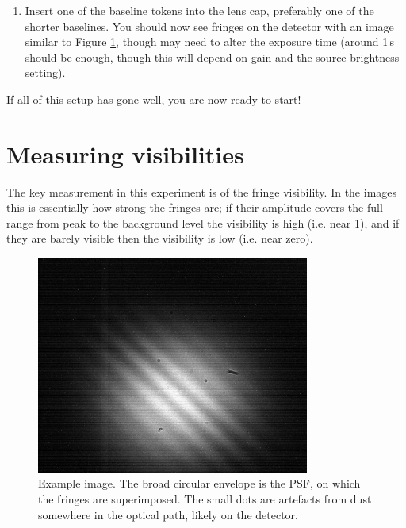 \documentclass[11pt]{article}
\begin{document}
\begin{enumerate}
    \item Insert one of the baseline tokens into the lens cap, preferably one of the shorter baselines. You should now see fringes on the detector with an image similar to Figure \ref{fig:det-img}, though may need to alter the exposure time (around 1\,s should be enough, though this will depend on gain and the source brightness setting).
\end{enumerate}

If all of this setup has gone well, you are now ready to start!

\clearpage
\section{Measuring visibilities}\label{sec:meas}

The key measurement in this experiment is of the fringe visibility. In the images this is essentially how strong the fringes are; if their amplitude covers the full range from peak to the background level the visibility is high (i.e. near 1), and if they are barely visible then the visibility is low (i.e. near zero).

\begin{figure}[h]
    \centering
    \includegraphics[width=0.8\textwidth]{doc/det-img.png}
    \caption{Example image. The broad circular envelope is the PSF, on which the fringes are superimposed. The small dots are artefacts from dust somewhere in the optical path, likely on the detector.}
    \label{fig:det-img}
\end{figure}
\end{document}
